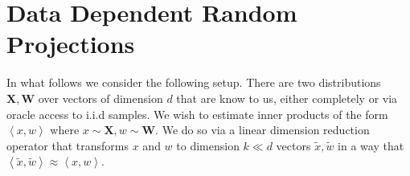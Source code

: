 \documentclass{article}
\theoremstyle{definition}
\theoremstyle{plain}
\newcommand{\X}{\mathbf{X}}
\newcommand{\W}{\mathbf{W}}
\newcommand{\ip}[1]{\left \langle #1 \right \rangle}
\begin{document}

\section{Data Dependent Random Projections} \label{sec:ddrp}

In what follows we consider the following setup. There are two distributions $\X, \W$ over vectors of dimension $d$ that are know to us, either completely or via oracle access to i.i.d samples. We wish to estimate inner products of the form $\ip{x,w}$ where $x \sim \X, w \sim \W$. We do so via a linear dimension reduction operator that transforms $x$ and $w$ to dimension $k \ll d$ vectors $\tilde{x}, \tilde{w}$ in a way that $\ip{\tilde{x}, \tilde{w}} \approx \ip{x,w}$.
\end{document}
